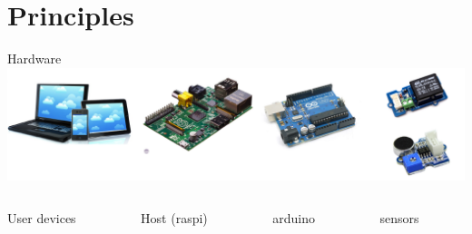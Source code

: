 \documentclass{beamer}
\begin{document}
\section{Principles}
\begin{frame}{Hardware}
\includegraphics[width=1\columnwidth]{figures/hardware.png}


\begin{columns}
\begin{column}[l]{0.25\textwidth}
\begin{center}User devices\end{center}
\end{column}
\begin{column}[l]{0.25\textwidth}
\begin{center}Host (raspi)\end{center}
\end{column}
\begin{column}[r]{0.25\textwidth}
\begin{center}arduino\end{center}
\end{column}
\begin{column}[r]{0.25\textwidth}
\begin{center}sensors\end{center}
\end{column}
\end{columns}
\end{frame}
\end{document}
